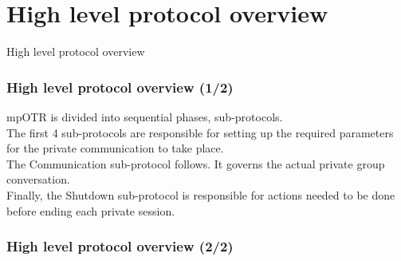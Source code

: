 \section{High level protocol overview}
\begin{frame}
\Huge{\centerline{High level protocol overview}}
\end{frame}

\begin{frame}
  \frametitle{High level protocol overview (1/2)}
  mpOTR is divided into sequential phases, sub-protocols.\\[0.3cm]
  
  The first 4 sub-protocols are responsible for setting up the required parameters for the private communication to take place.\\[0.3cm]
  
  The Communication sub-protocol follows. It governs the actual private group conversation.\\[0.3cm]
  
  Finally, the Shutdown sub-protocol is responsible for actions needed to be done before ending each private session.\\[0.3cm]

\end{frame}

\begin{frame}
  \frametitle{High level protocol overview (2/2)}

\end{frame}
